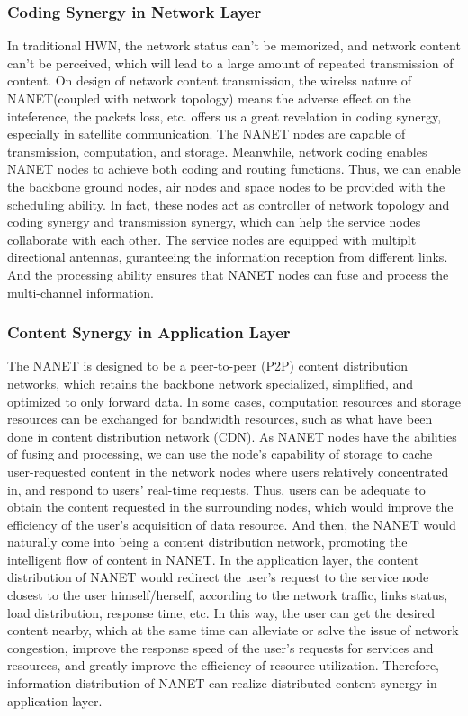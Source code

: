 \documentclass[journal,comsoc]{IEEEtran}
\begin{document}
			\subsubsection{Coding Synergy in Network Layer}
				In traditional HWN, the network status can't be memorized, and network content can't be perceived, which will lead to a large amount of repeated transmission of content.
				On design of network content transmission, the wirelss nature of NANET(coupled with network topology) means the adverse effect on the inteference, the packets loss, etc.
				\cite{ahlswede2000network} offers us a great revelation in coding synergy, especially in satellite communication. 
				The NANET nodes are capable of transmission, computation, and storage.
				Meanwhile, network coding enables NANET nodes to achieve both coding and routing functions.
				Thus, we can enable the backbone ground nodes, air nodes and space nodes to be provided with the scheduling ability.
				In fact, these nodes act as controller of network topology and coding synergy and transmission synergy, which can help the service nodes collaborate with each other.
				The service nodes are equipped with multiplt directional antennas, guranteeing the information reception from different links.
				And the processing ability ensures that NANET nodes can fuse and process the multi-channel information.

			\subsubsection{Content Synergy in Application Layer}
				The NANET is designed to be a peer-to-peer (P2P) content distribution networks, which retains the backbone network specialized, simplified, and optimized to only forward data.
				In some cases, computation resources and storage resources can be exchanged for bandwidth resources, such as what have been done in content distribution network (CDN)\cite{gkantsidis2005network}\cite{peng2004cdn}. 
				As NANET nodes have the abilities of fusing and processing, we can use the node's capability of storage to cache user-requested content in the network nodes where users relatively concentrated in, and respond to users' real-time requests. 
				Thus, users can be adequate to obtain the content requested in the surrounding nodes, which would improve the efficiency of the user's acquisition of data resource.
				And then, the NANET would naturally come into being a content distribution network, promoting the intelligent flow of content in NANET.
				In the application layer, the content distribution of NANET would redirect the user's request to the service node closest to the user himself/herself, according to the network traffic, links status, load distribution, response time, etc.
				In this way, the user can get the desired content nearby, which at the same time can alleviate or solve the issue of network congestion, improve the response speed of the user's requests for services and resources, and greatly improve the efficiency of resource utilization.
				Therefore, information distribution of NANET can realize distributed content synergy in application layer.
				
\end{document}

